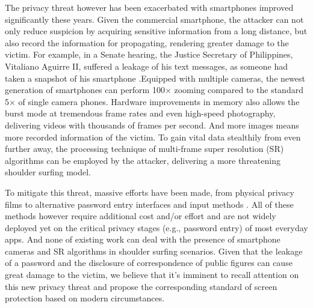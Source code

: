 The privacy threat however has been exacerbated with smartphones improved significantly these years. Given the commercial smartphone, the attacker can not only reduce suspicion by acquiring sensitive information from a long distance, but also record the information for propagating, rendering greater damage to the victim. For example, in a Senate hearing, the Justice Secretary of Philippines, Vitaliano Aguirre II, suffered a leakage of his text messages, as someone had taken a snapshot of his smartphone \cite{Polotiko2017leakage}.Equipped with multiple cameras, the newest generation of smartphones can perform 100$\times$ zooming compared to the standard 5$\times$ of single camera phones. Hardware improvements in memory also allows the burst mode at tremendous frame rates and even high-speed photography, delivering videos with thousands of frames per second. And more images means more recorded information of the victim. To gain vital data stealthily from even further away, the processing technique of multi-frame super resolution (SR) algorithms can be employed by the attacker, delivering a more threatening shoulder surfing model.


To mitigate this threat, massive efforts have been made, from physical privacy films to alternative password entry interfaces \cite{wiedenbeck2006design,papadopoulos2017illusionpin} and input methods \cite{kumar2007reducing}. All of these methods however require additional cost and/or effort \cite{Chun2019Keep} and are not widely deployed yet on the critical privacy stages (e.g., password entry) of most everyday apps. And none of existing work can deal with the presence of smartphone cameras and SR algorithms in shoulder surfing scenarios. Given that the leakage of a password and the disclosure of correspondence of public figures can cause great damage to the victim, we believe that it's imminent to recall attention on this new privacy threat and propose the corresponding standard of screen protection based on modern circumstances.

